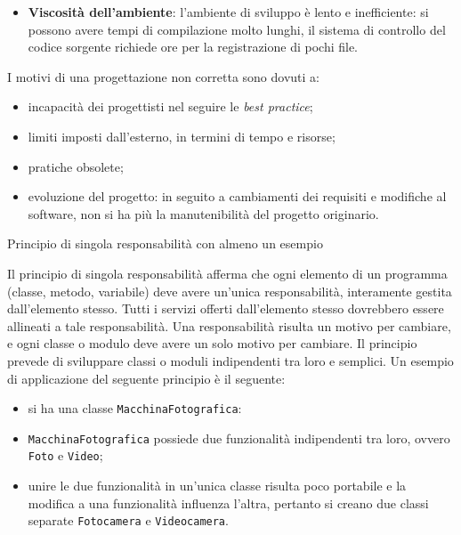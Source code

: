 \begin{solution}
\begin{enumerate}
\begin{itemize}
		\item \textbf{Viscosità dell'ambiente}: l'ambiente di sviluppo è lento e inefficiente: si possono avere tempi di compilazione molto lunghi, il sistema di controllo del codice sorgente richiede ore per la registrazione di pochi file.
	\end{itemize}
\end{enumerate}
I motivi di una progettazione non corretta sono dovuti a:
\begin{itemize}
	\item incapacità dei progettisti nel seguire le \textit{best practice};
	\item limiti imposti dall'esterno, in termini di tempo e risorse;
	\item pratiche obsolete;
	\item evoluzione del progetto: in seguito a cambiamenti dei requisiti e modifiche al software, non si ha più la manutenibilità del progetto originario.
\end{itemize}
\end{solution}


\begin{problem}{1.11}
Principio di singola responsabilità con almeno un esempio
\end{problem}
\begin{solution}
Il principio di singola responsabilità afferma che ogni elemento di un programma (classe, metodo, variabile) deve avere un'unica responsabilità, interamente gestita dall'elemento stesso.
Tutti i servizi offerti dall'elemento stesso dovrebbero essere allineati a tale responsabilità.
\newline
Una responsabilità risulta un motivo per cambiare, e ogni classe o modulo deve avere un solo motivo per cambiare.
\newline
Il principio prevede di sviluppare classi o moduli indipendenti tra loro e semplici.
Un esempio di applicazione del seguente principio è il seguente:
\begin{itemize}
	\item si ha una classe \texttt{MacchinaFotografica}:
	\item \texttt{MacchinaFotografica} possiede due funzionalità indipendenti tra loro, ovvero \texttt{Foto} e \texttt{Video};
	\item unire le due funzionalità in un'unica classe risulta poco portabile e la modifica a una funzionalità influenza l'altra, pertanto si creano due classi separate \texttt{Fotocamera} e \texttt{Videocamera}.
\end{itemize}
\end{solution}


